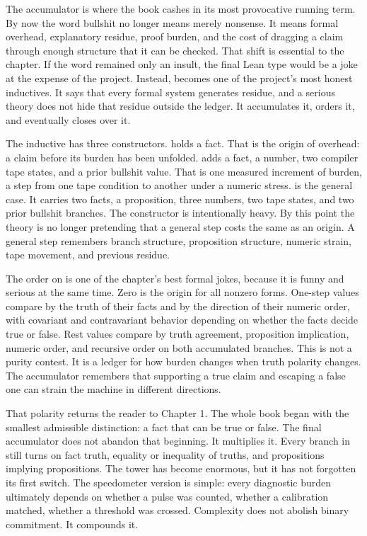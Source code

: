 The accumulator is where the book cashes in its most provocative running
term. By now the word bullshit no longer means merely nonsense. It means
formal overhead, explanatory residue, proof burden, and the cost of dragging a
claim through enough structure that it can be checked. That shift is essential
to the chapter. If the word remained only an insult, the final Lean type would
be a joke at the expense of the project. Instead,  becomes one
of the project's most honest inductives. It says that every formal system
generates residue, and a serious theory does not hide that residue outside the
ledger. It accumulates it, orders it, and eventually closes over it.

The inductive has three constructors.  holds a fact. That is the
origin of overhead: a claim before its burden has been unfolded. 
adds a fact, a number, two compiler tape states, and a prior bullshit value.
That is one measured increment of burden, a step from one tape condition to
another under a numeric stress.  is the general case. It carries
two facts, a proposition, three numbers, two tape states, and two prior
bullshit branches. The constructor is intentionally heavy. By this point the
theory is no longer pretending that a general step costs the same as an
origin. A general step remembers branch structure, proposition structure,
numeric strain, tape movement, and previous residue.

The order on  is one of the chapter's best formal jokes,
because it is funny and serious at the same time. Zero is the origin for all
nonzero forms. One-step values compare by the truth of their facts and by the
direction of their numeric order, with covariant and contravariant behavior
depending on whether the facts decide true or false. Rest values compare by
truth agreement, proposition implication, numeric order, and recursive order
on both accumulated branches. This is not a purity contest. It is a ledger
for how burden changes when truth polarity changes. The accumulator remembers
that supporting a true claim and escaping a false one can strain the machine
in different directions.

That polarity returns the reader to Chapter 1. The whole book began with the
smallest admissible distinction: a fact that can be true or false. The final
accumulator does not abandon that beginning. It multiplies it. Every branch in
 still turns on fact truth, equality or inequality of
truths, and propositions implying propositions. The tower has become enormous,
but it has not forgotten its first switch. The speedometer version is simple:
every diagnostic burden ultimately depends on whether a pulse was counted,
whether a calibration matched, whether a threshold was crossed. Complexity
does not abolish binary commitment. It compounds it.

